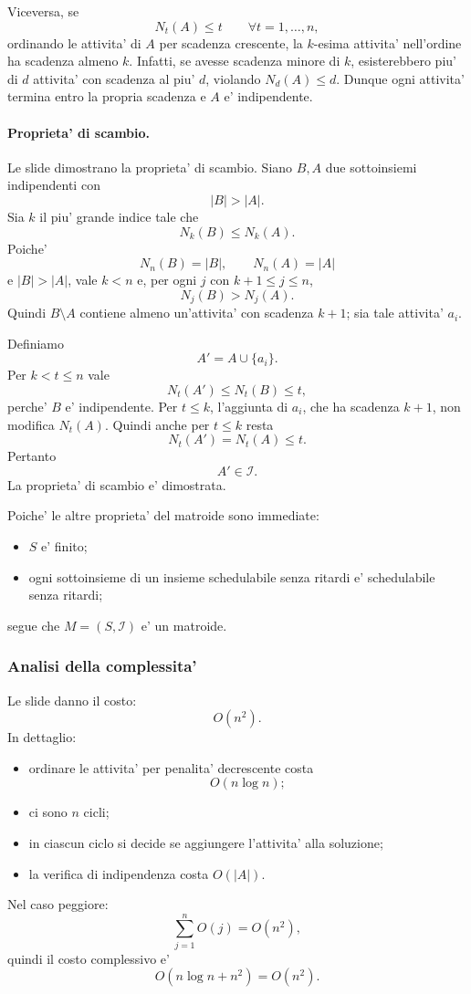 Viceversa, se
\[
N_t(A)\le t\qquad\forall t=1,\ldots,n,
\]
ordinando le attivita' di $A$ per scadenza crescente, la $k$-esima attivita' nell'ordine ha scadenza almeno $k$. Infatti, se avesse scadenza minore di $k$, esisterebbero piu' di $d$ attivita' con scadenza al piu' $d$, violando $N_d(A)\le d$. Dunque ogni attivita' termina entro la propria scadenza e $A$ e' indipendente.

\paragraph{Proprieta' di scambio.}
Le slide dimostrano la proprieta' di scambio. Siano $B,A$ due sottoinsiemi indipendenti con
\[
|B|>|A|.
\]
Sia $k$ il piu' grande indice tale che
\[
N_k(B)\le N_k(A).
\]
Poiche'
\[
N_n(B)=|B|,\qquad N_n(A)=|A|
\]
e $|B|>|A|$, vale $k<n$ e, per ogni $j$ con $k+1\le j\le n$,
\[
N_j(B)>N_j(A).
\]
Quindi $B\setminus A$ contiene almeno un'attivita' con scadenza $k+1$; sia tale attivita' $a_i$.

Definiamo
\[
A'=A\cup\{a_i\}.
\]
Per $k<t\le n$ vale
\[
N_t(A')\le N_t(B)\le t,
\]
perche' $B$ e' indipendente. Per $t\le k$, l'aggiunta di $a_i$, che ha scadenza $k+1$, non modifica $N_t(A)$. Quindi anche per $t\le k$ resta
\[
N_t(A')=N_t(A)\le t.
\]
Pertanto
\[
A'\in\mathcal{I}.
\]
La proprieta' di scambio e' dimostrata.

Poiche' le altre proprieta' del matroide sono immediate:
\begin{itemize}
	\item $S$ e' finito;
	\item ogni sottoinsieme di un insieme schedulabile senza ritardi e' schedulabile senza ritardi;
\end{itemize}
segue che $M=(S,\mathcal{I})$ e' un matroide.

\subsubsection{Analisi della complessita'}
Le slide danno il costo:
\[
O(n^2).
\]
In dettaglio:
\begin{itemize}
	\item ordinare le attivita' per penalita' decrescente costa
	\[
	O(n\log n);
	\]
	\item ci sono $n$ cicli;
	\item in ciascun ciclo si decide se aggiungere l'attivita' alla soluzione;
	\item la verifica di indipendenza costa $O(|A|)$.
\end{itemize}
Nel caso peggiore:
\[
\sum_{j=1}^{n} O(j)=O(n^2),
\]
quindi il costo complessivo e'
\[
O(n\log n+n^2)=O(n^2).
\]

